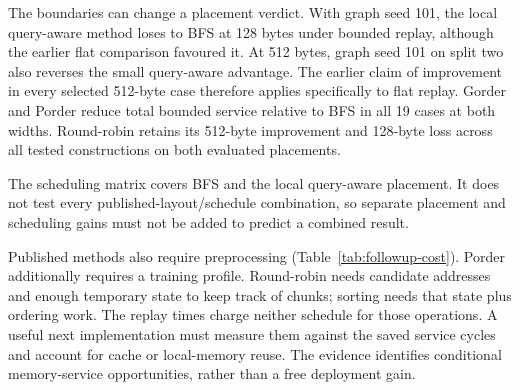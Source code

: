 The boundaries can change a placement verdict. With graph seed 101, the local query-aware method loses to BFS at 128 bytes under bounded replay, although the earlier flat comparison favoured it. At 512 bytes, graph seed 101 on split two also reverses the small query-aware advantage. The earlier claim of improvement in every selected 512-byte case therefore applies specifically to flat replay. Gorder and Porder reduce total bounded service relative to BFS in all 19 cases at both widths. Round-robin retains its 512-byte improvement and 128-byte loss across all tested constructions on both evaluated placements.

\begin{table}[htbp]\centering\small
\caption[Bounded placement across graph constructions]{Cycle differences relative to BFS under bounded replay. Entries show means and observed ranges over three matched splits, all in percent.}\label{tab:followup-graphs}
\resizebox{\textwidth}{!}{}
\end{table}
\begin{table}[htbp]\centering\small
\caption[Scheduling across graph constructions]{Cycle differences relative to the same placement's original-order bounded replay. Entries show means and observed ranges over three matched splits, in percent. QA denotes the local query-aware placement.}\label{tab:followup-schedule-graphs}
\resizebox{\textwidth}{!}{}
\end{table}

\begin{table}[htbp]\centering
\caption[Published-layout preprocessing]{Observed shared-host layout construction time across the 19 graph/split cases. Porder uses the adapted queue; graph loading, training searches and profile extraction are excluded. These are implementation cost observations, not isolated algorithm throughput benchmarks.}\label{tab:followup-cost}

\end{table}
The scheduling matrix covers BFS and the local query-aware placement. It does not test every published-layout/schedule combination, so separate placement and scheduling gains must not be added to predict a combined result.

Published methods also require preprocessing (Table~\ref{tab:followup-cost}). Porder additionally requires a training profile. Round-robin needs candidate addresses and enough temporary state to keep track of chunks; sorting needs that state plus ordering work. The replay times charge neither schedule for those operations. A useful next implementation must measure them against the saved service cycles and account for cache or local-memory reuse. The evidence identifies conditional memory-service opportunities, rather than a free deployment gain.
